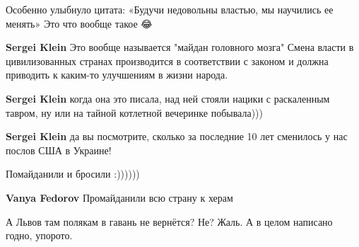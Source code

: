 \begin{itemize}
Особенно улыбнуло цитата:
«Будучи недовольны властью, мы научились ее менять»
Это что вообще такое 😂

\begin{itemize}
 
\textbf{Sergei Klein} Это вообще называется "майдан головного мозга" \Smiley[1.0][yellow] Смена власти в цивилизованных странах производится в соответствии с законом и должна приводить к каким-то улучшениям в жизни народа.

 
\textbf{Sergei Klein} когда она это писала, над ней стояли нацики с раскаленным тавром, ну или на тайной котлетной вечеринке побывала)))

 
\textbf{Sergei Klein} да вы посмотрите, сколько за последние 10 лет сменилось у нас послов США в Украине!

 
Помайданили и бросили :))))))

\textbf{Vanya Fedorov}
Промайданили всю страну к херам
\end{itemize}

 
А Львов там полякам в гавань не вернётся? Не? Жаль. А в целом написано годно, упорото.

\begin{itemize}

 

\end{itemize}
\end{itemize}
